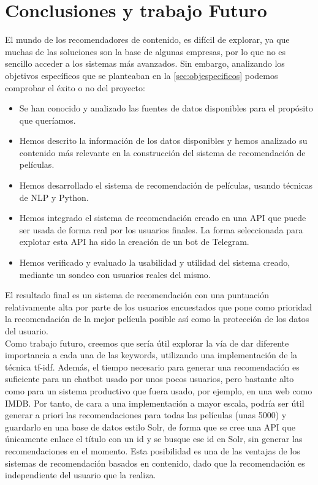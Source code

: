 \chapter{Conclusiones y trabajo Futuro}\label{chap:futuro}

El mundo de los recomendadores de contenido, es difícil de explorar, ya que muchas de las soluciones son la base de algunas empresas, por lo que no es sencillo acceder a los sistemas más avanzados. Sin embargo, analizando los objetivos específicos que se planteaban en la \autoref{sec:objespecificos} podemos comprobar el éxito o no del proyecto:
\begin{itemize}
    \item Se han conocido y analizado las fuentes de datos disponibles para el propósito que queríamos.
    \item Hemos descrito la información de los datos disponibles y hemos analizado su contenido más relevante en la construcción del sistema de recomendación de películas.
    \item Hemos desarrollado el sistema de recomendación de películas, usando técnicas de NLP y Python.
    \item Hemos integrado el sistema de recomendación creado en una API que puede ser usada de forma real por los usuarios finales. La forma seleccionada para explotar esta API ha sido la creación de un bot de Telegram.
    \item Hemos verificado y evaluado la usabilidad y utilidad del sistema creado, mediante un sondeo con usuarios reales del mismo.
\end{itemize}

El resultado final es un sistema de recomendación con una puntuación relativamente alta por parte de los usuarios encuestados que pone como prioridad la recomendación de la mejor película posible así como la protección de los datos del usuario.\\

Como trabajo futuro, creemos que sería útil explorar la vía de dar diferente importancia a cada una de las keywords, utilizando una implementación de la técnica tf-idf. Además, el tiempo necesario para generar una recomendación es suficiente para un chatbot usado por unos pocos usuarios, pero bastante alto como para un sistema productivo que fuera usado, por ejemplo, en una web como IMDB. Por tanto, de cara a una implementación a mayor escala, podría ser útil generar a priori las recomendaciones para todas las películas (unas 5000) y guardarlo en una base de datos estilo Solr, de forma que se cree una API que únicamente enlace el título con un id y se busque ese id en Solr, sin generar las recomendaciones en el momento. Esta posibilidad es una de las ventajas de los sistemas de recomendación basados en contenido, dado que la recomendación es independiente del usuario que la realiza.